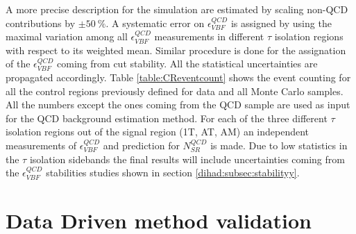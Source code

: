 \begin{table}[ht]
	\caption{ Values for $\epsilon^{QCD}_{VBF}$ and $N^{QCD}_{SR}$ for different $ \tau $ isolation regions.}
	\label{table:VBFeffBKGprediction} %
\end{table}


A more precise description for the simulation are estimated by scaling non-QCD contributions by $\pm50~\%$. A systematic error on $\epsilon^{QCD}_{VBF}$ is assigned by using the maximal variation among all $\epsilon^{QCD}_{VBF}$ measurements in different $\tau$ isolation regions with respect to its weighted mean. Similar procedure is done for the assignation of the $\epsilon^{QCD}_{VBF}$ coming from \met cut stability. All the statistical uncertainties are propagated accordingly. Table \ref{table:CReventcount} shows the event counting for all the control regions previously defined for data and all Monte Carlo samples. All the numbers except the ones coming from the QCD sample are used as input for the QCD background estimation method. For each of the three different $\tau$ isolation regions out of the signal region (1T, AT, AM) an independent measurements of $\epsilon^{QCD}_{VBF}$  and prediction for $N^{QCD}_{SR}$ is made. Due to low statistics in the $\tau$ isolation sidebands the final results will include uncertainties coming from the $\epsilon^{QCD}_{VBF}$ stabilities studies shown in section \ref{dihad:subsec:stabilityy}.

\section{Data Driven method validation}
\label{QCD_bg_pred_validation}

